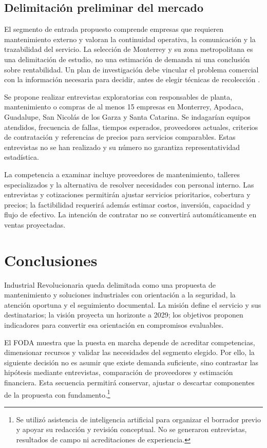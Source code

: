 {\subsection{Delimitación preliminar del mercado}

El segmento de entrada propuesto comprende empresas que requieren mantenimiento externo y valoran la continuidad operativa, la comunicación y la trazabilidad del servicio. La selección de Monterrey y su zona metropolitana es una delimitación de estudio, no una estimación de demanda ni una conclusión sobre rentabilidad. Un plan de investigación debe vincular el problema comercial con la información necesaria para decidir, antes de elegir técnicas de recolección \citep{albrechtMarketing2023}.

Se propone realizar entrevistas exploratorias con responsables de planta, mantenimiento o compras de al menos 15 empresas en Monterrey, Apodaca, Guadalupe, San Nicolás de los Garza y Santa Catarina. Se indagarían equipos atendidos, frecuencia de fallas, tiempos esperados, proveedores actuales, criterios de contratación y referencias de precios para servicios comparables. Estas entrevistas no se han realizado y su número no garantiza representatividad estadística.

La competencia a examinar incluye proveedores de mantenimiento, talleres especializados y la alternativa de resolver necesidades con personal interno. Las entrevistas y cotizaciones permitirán ajustar servicios prioritarios, cobertura y precios; la factibilidad requerirá además estimar costos, inversión, capacidad y flujo de efectivo. La intención de contratar no se convertirá automáticamente en ventas proyectadas.

\section{Conclusiones}

Industrial Revolucionaria queda delimitada como una propuesta de mantenimiento y soluciones industriales con orientación a la seguridad, la atención oportuna y el seguimiento documental. La misión define el servicio y sus destinatarios; la visión proyecta un horizonte a 2029; los objetivos proponen indicadores para convertir esa orientación en compromisos evaluables.

El FODA muestra que la puesta en marcha depende de acreditar competencias, dimensionar recursos y validar las necesidades del segmento elegido. Por ello, la siguiente decisión no es asumir que existe demanda suficiente, sino contrastar las hipótesis mediante entrevistas, comparación de proveedores y estimación financiera. Esta secuencia permitirá conservar, ajustar o descartar componentes de la propuesta con fundamento.\footnote{Se utilizó asistencia de inteligencia artificial para organizar el borrador previo y apoyar su redacción y revisión conceptual. No se generaron entrevistas, resultados de campo ni acreditaciones de experiencia.}
}

